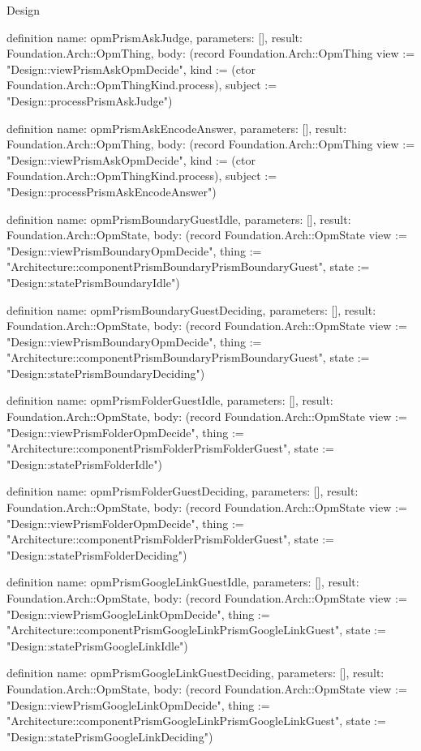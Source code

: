 \begin{lexlean}{Design}
\begin{semanticmodule}
definition{
  name: opmPrismAskJudge,
  parameters: [],
  result: Foundation.Arch::OpmThing,
  body: (record Foundation.Arch::OpmThing {view := "Design::viewPrismAskOpmDecide", kind := (ctor Foundation.Arch::OpmThingKind.process), subject := "Design::processPrismAskJudge"})
}

definition{
  name: opmPrismAskEncodeAnswer,
  parameters: [],
  result: Foundation.Arch::OpmThing,
  body: (record Foundation.Arch::OpmThing {view := "Design::viewPrismAskOpmDecide", kind := (ctor Foundation.Arch::OpmThingKind.process), subject := "Design::processPrismAskEncodeAnswer"})
}

definition{
  name: opmPrismBoundaryGuestIdle,
  parameters: [],
  result: Foundation.Arch::OpmState,
  body: (record Foundation.Arch::OpmState {view := "Design::viewPrismBoundaryOpmDecide", thing := "Architecture::componentPrismBoundaryPrismBoundaryGuest", state := "Design::statePrismBoundaryIdle"})
}

definition{
  name: opmPrismBoundaryGuestDeciding,
  parameters: [],
  result: Foundation.Arch::OpmState,
  body: (record Foundation.Arch::OpmState {view := "Design::viewPrismBoundaryOpmDecide", thing := "Architecture::componentPrismBoundaryPrismBoundaryGuest", state := "Design::statePrismBoundaryDeciding"})
}

definition{
  name: opmPrismFolderGuestIdle,
  parameters: [],
  result: Foundation.Arch::OpmState,
  body: (record Foundation.Arch::OpmState {view := "Design::viewPrismFolderOpmDecide", thing := "Architecture::componentPrismFolderPrismFolderGuest", state := "Design::statePrismFolderIdle"})
}

definition{
  name: opmPrismFolderGuestDeciding,
  parameters: [],
  result: Foundation.Arch::OpmState,
  body: (record Foundation.Arch::OpmState {view := "Design::viewPrismFolderOpmDecide", thing := "Architecture::componentPrismFolderPrismFolderGuest", state := "Design::statePrismFolderDeciding"})
}

definition{
  name: opmPrismGoogleLinkGuestIdle,
  parameters: [],
  result: Foundation.Arch::OpmState,
  body: (record Foundation.Arch::OpmState {view := "Design::viewPrismGoogleLinkOpmDecide", thing := "Architecture::componentPrismGoogleLinkPrismGoogleLinkGuest", state := "Design::statePrismGoogleLinkIdle"})
}

definition{
  name: opmPrismGoogleLinkGuestDeciding,
  parameters: [],
  result: Foundation.Arch::OpmState,
  body: (record Foundation.Arch::OpmState {view := "Design::viewPrismGoogleLinkOpmDecide", thing := "Architecture::componentPrismGoogleLinkPrismGoogleLinkGuest", state := "Design::statePrismGoogleLinkDeciding"})
}


\end{semanticmodule}
\end{lexlean}
